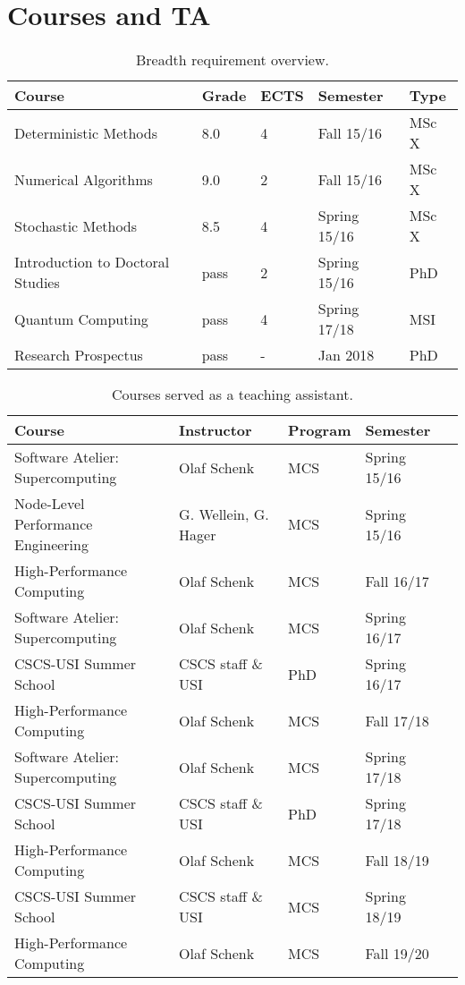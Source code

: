 \chapter{Courses and TA}

\begin{table}[h!]
\centering
\caption{Breadth requirement overview.}
\label{tab:courses}
\begin{tabular}{lllll}
\hline
Course                           & Grade & ECTS & Semester & Type  \\ \hline
Deterministic Methods       & 8.0 & 4 & Fall 15/16 & MSc X \\
Numerical Algorithms        & 9.0 & 2 & Fall 15/16 & MSc X \\
Stochastic Methods          & 8.5 & 4 & Spring 15/16 & MSc X \\
Introduction to Doctoral Studies & pass & 2 & Spring 15/16 & PhD \\
Quantum Computing           & pass & 4 & Spring	17/18 & MSI \\
\hline
Research Prospectus &  pass    & -    & Jan 2018  & PhD   \\ \hline
 \hline
\end{tabular}
\end{table}

\begin{table}[h!]
\centering
\caption{Courses served as a teaching assistant.}
\label{tab:ta}
\begin{tabular}{lllll}
\hline
Course                               & Instructor             & Program & Semester  \\ \hline
Software Atelier: Supercomputing & Olaf Schenk & MCS & Spring 15/16 \\
Node-Level Performance Engineering & G. Wellein, G. Hager & MCS & Spring 15/16 \\
High-Performance Computing & Olaf Schenk & MCS & Fall 16/17 \\
Software Atelier: Supercomputing & Olaf Schenk & MCS & Spring 16/17 \\
CSCS-USI Summer School & CSCS staff \& USI & PhD & Spring 16/17 \\
High-Performance Computing & Olaf Schenk & MCS & Fall 17/18 \\
Software Atelier: Supercomputing & Olaf Schenk & MCS & Spring 17/18 \\
CSCS-USI Summer School & CSCS staff \& USI & PhD & Spring 17/18 \\
High-Performance Computing & Olaf Schenk & MCS & Fall 18/19 \\
CSCS-USI Summer School & CSCS staff \& USI & MCS & Spring 18/19 \\
High-Performance Computing & Olaf Schenk & MCS & Fall 19/20	\\ \hline
 \hline
\end{tabular}
\end{table}
